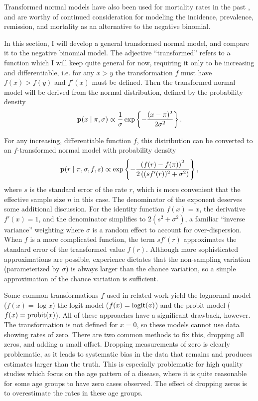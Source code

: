Transformed normal models have also been used for mortality rates in
the past \cite{Girotsis and King-Demographic Forecasting Book}, and
are worthy of continued consideration for modeling the incidence,
prevalence, remission, and mortality as an alternative to the negative
binomial.

In this section, I will develop a general transformed normal model,
and compare it to the negative binomial model.  The adjective
``transformed'' refers to a function which I will keep quite general
for now, requiring it only to be increasing and differentiable,
i.e. for any $x > y$ the transformation $f$ must have $f(x) > f(y)$
and $f'(x)$ must be defined.  Then the transformed normal model will
be derived from the normal distribution, defined by the probability
density
\[
\mathbf{p}(x\;|\; \pi, \sigma)
 \propto \frac{1}{\sigma}
\exp\left\{ -\frac{(x-\pi)^2}{2\sigma^2} \right\}.
\]

For any increasing, differentiable function $f$, this distribution can
be converted to an $f$-transformed normal model with probability
density
\[
\mathbf{p}(r \;|\; \pi, \sigma, f, s) \propto
\exp\left\{-\frac{\left(f(r)-f(\pi)\right)^2}{2\left((sf'(r))^2+\sigma^2\right)}\right\},
\]
where $s$ is the standard error of the rate $r$, which is more
convenient that the effective sample size $n$ in this case. The
denominator of the exponent deserves some additional discussion.  For
the identity function $f(x) = x$, the derivative $f'(x) = 1$, and the
denominator simplifies to $2(s^2 + \sigma^2)$, a familiar ``inverse
variance'' weighting where $\sigma$ is a random effect to account for
over-dispersion.  When $f$ is a more complicated function, the term
$sf'(r)$ approximates the standard error of the transformed value
$f(r)$.  Although more sophisticated approximations are possible,
experience dictates that the non-sampling variation (parameterized by
$\sigma$) is always larger than the chance variation, so a simple
approximation of the chance variation is sufficient.

Some common transformations $f$ used in related work yield the
lognormal model ($f(x) = \log x$) the logit model ($f(x) = \operatorname{logit}(x)$)
and the probit model ($f(x) = \operatorname{probit}(x)$).  All of these approaches
have a significant drawback, however.  The transformation is not
defined for $x=0$, so these models cannot use data showing rates of
zero. There are two common methods to fix this, dropping all zeros,
and adding a small offset.  Dropping measurements of zero is clearly
problematic, as it leads to systematic bias in the data that remains
and produces estimates larger than the truth.  This is especially
problematic for high quality studies which focus on the age pattern of
a disease, where it is quite reasonable for some age groups to have
zero cases observed.  The effect of dropping zeros is to overestimate
the rates in these age groups.

